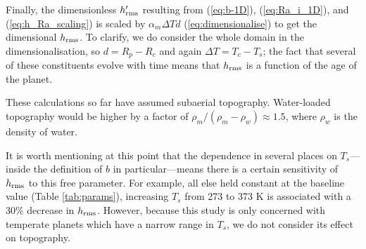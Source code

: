 \documentclass[trackchanges]{aastex63}
\begin{document}

Finally, the dimensionless $h_{\rm rms}^\prime$ resulting from (\ref{eq:b-1D}), (\ref{eq:Ra_i_1D}), and (\ref{eq:h_Ra_scaling}) is scaled by $\alpha_m \Delta T d$ (\ref{eq:dimensionalise}) to get the dimensional $h_{\rm rms}$. To clarify, we do consider the whole domain in the dimensionalisation, so $d = R_p - R_c$ and again $\Delta T = T_c - T_s$; the fact that several of these constituents evolve with time means that $h_{\rm rms}$ is a function of the age of the planet.

These calculations so far have assumed subaerial topography. Water-loaded topography would be higher by a factor of $\rho_m/(\rho_m - \rho_w) \approx 1.5$, where $\rho_w$ is the density of water.

It is worth mentioning at this point that the dependence in several places on $T_s$---inside the definition of $b$ in particular---means there is a certain sensitivity of $h_{\rm rms}$ to this free parameter. For example, all else held constant at the baseline value (Table \ref{tab:params}), increasing $T_s$ from 273 to 373 K is associated with a 30\% decrease in $h_{\rm rms}$. However, because this study is only concerned with temperate planets which have a narrow range in $T_s$, we do not consider its effect on topography.
\end{document}
